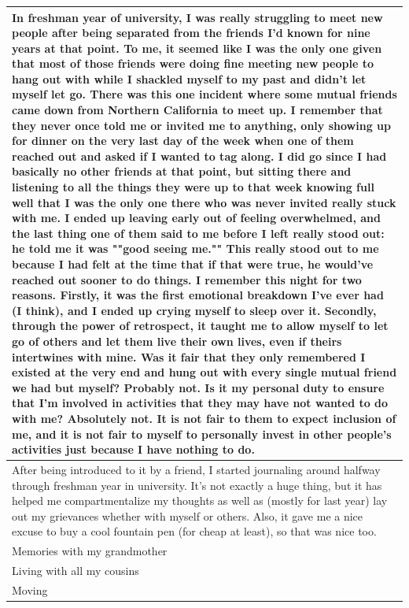 \documentclass[
  .7em,
  letterpaper,
  DIV=11,
  numbers=noendperiod]{scrartcl}
\begin{document}
\begin{table}
\begin{tabular}{l}
In freshman year of university, I was really struggling to meet new people after being separated from the friends I'd known for nine years at that point. To me, it seemed like I was the only one given that most of those friends were doing fine meeting new people to hang out with while I shackled myself to my past and didn't let myself let go. There was this one incident where some mutual friends came down from Northern California to meet up. I remember that they never once told me or invited me to anything, only showing up for dinner on the very last day of the week when one of them reached out and asked if I wanted to tag along. I did go since I had basically no other friends at that point, but sitting there and listening to all the things they were up to that week knowing full well that I was the only one there who was never invited really stuck with me. I ended up leaving early out of feeling overwhelmed, and the last thing one of them said to me before I left really stood out: he told me it was ""good seeing me."" This really stood out to me because I had felt at the time that if that were true, he would've reached out sooner to do things. I remember this night for two reasons. Firstly, it was the first emotional breakdown I've ever had (I think), and I ended up crying myself to sleep over it. Secondly, through the power of retrospect, it taught me to allow myself to let go of others and let them live their own lives, even if theirs intertwines with mine. Was it fair that they only remembered I existed at the very end and hung out with every single mutual friend we had but myself? Probably not. Is it my personal duty to ensure that I'm involved in activities that they may have not wanted to do with me? Absolutely not. It is not fair to them to expect inclusion of me, and it is not fair to myself to personally invest in other people's activities just because I have nothing to do.\\
\hline
After being introduced to it by a friend, I started journaling around halfway through freshman year in university. It's not exactly a huge thing, but it has helped me compartmentalize my thoughts as well as (mostly for last year) lay out my grievances whether with myself or others. Also, it gave me a nice excuse to buy a cool fountain pen (for cheap at least), so that was nice too.\\
\hline
Memories with my grandmother\\
\hline
Living with all my cousins\\
\hline
Moving\\

\end{tabular}
\end{table}
\end{document}
